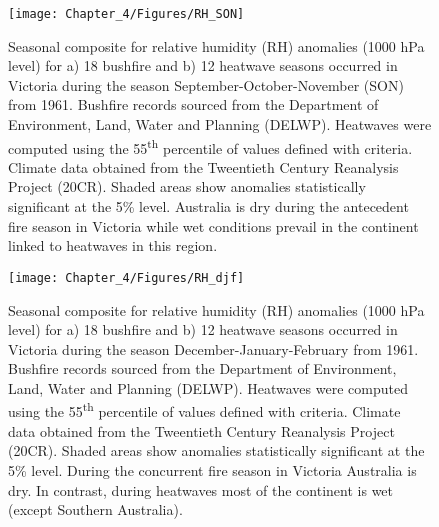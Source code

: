 \begin{figure}[h]
\noindent \begin{centering}
\texttt{[image: Chapter\_4/Figures/RH\_SON]}
\par\end{centering}

\caption[Seasonal composite for relative humidity (RH) anomalies (1000 hPa
level) for a) 18 bushfire and b) 12 heatwave seasons occurred in Victoria during  the
season September-October-November (SON) from 1961.]{Seasonal composite for relative humidity (RH) anomalies (1000 hPa
level) for a) 18 bushfire and b) 12 heatwave seasons occurred in Victoria during  the
season September-October-November (SON) from 1961.
Bushfire records sourced from the Department of Environment, Land,
Water and Planning (DELWP). Heatwaves were computed using the 55\protect\textsuperscript{th}
percentile of values defined with \citet{Nairn2009} criteria. Climate
data obtained from the Tweentieth Century Reanalysis Project (20CR).
Shaded areas show anomalies statistically significant at the 5\% level.
Australia is dry during the antecedent fire season in Victoria while
wet conditions prevail in the continent linked to heatwaves in this
region.\label{fig: Relative humidity anomalies (1000 hPa level) of bushfire and heatwave seasons in September-October-November for the period 1961=0020132011}}


\end{figure}


\begin{figure}[h]
\noindent \begin{centering}
\texttt{[image: Chapter\_4/Figures/RH\_djf]}
\par\end{centering}

\caption[Seasonal composite for relative humidity (RH) anomalies (1000 hPa
level) for a) 18 bushfire and b) 12 heatwave seasons occurred in Victoria during the
season December-January-February from 1961]{Seasonal composite for relative humidity (RH) anomalies (1000 hPa
level) for a) 18 bushfire and b) 12 heatwave seasons occurred in Victoria during the
season December-January-February from 1961. Bushfire
records sourced from the Department of Environment, Land, Water and
Planning (DELWP). Heatwaves were computed using the 55\protect\textsuperscript{th}
percentile of values defined with \citet{Nairn2009} criteria. Climate
data obtained from the Tweentieth Century Reanalysis Project (20CR).
Shaded areas show anomalies statistically significant at the 5\% level.
During the concurrent fire season in Victoria Australia is dry. In
contrast, during heatwaves most of the continent is wet (except Southern
Australia). \label{fig: Relative humidity anomalies (1000 hPa level) of bushfire and heatwave seasons in December-January-February for the period 1961=0020132011}}


\end{figure}



